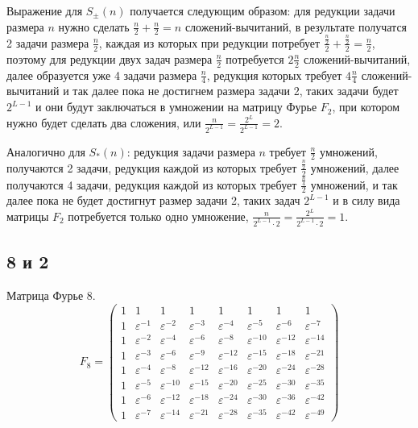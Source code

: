 Выражение для $S_\pm(n)$ получается следующим образом: для редукции задачи размера $n$ нужно сделать $\frac{n}{2} + \frac{n}{2} = n$ сложений-вычитаний,
в результате получатся 2 задачи размера $\frac{n}{2}$, каждая из которых при редукции потребует $\frac{\frac{n}{2}}{2} + \frac{\frac{n}{2}}{2} = \frac{n}{2}$, поэтому для редукции
двух задач размера $\frac{n}{2}$ потребуется $2 \frac{n}{2}$ сложений-вычитаний, далее образуется уже 4 задачи размера $\frac{n}{4}$, редукция которых требует $4 \frac{n}{4}$
сложений-вычитаний и так далее пока не достигнем размера задачи 2, таких задачи будет $2^{L-1}$ и они будут заключаться в умножении на матрицу Фурье $F_2$, при котором нужно будет
сделать два сложения, или $\frac{n}{2^{L-1}} = \frac{2^L}{2^{L-1}} = 2$.

Аналогично для $S_*(n)$: редукция задачи размера $n$ требует $\frac{n}{2}$ умножений, получаются 2 задачи, редукция каждой из которых требует $\frac{\frac{n}{2}}{2}$ умножений, далее
получаются 4 задачи, редукция каждой из которых требует $\frac{\frac{n}{4}}{2}$ умножений, и так далее пока не будет достигнут размер задачи 2, таких задач $2^{L-1}$ и в силу
вида матрицы $F_2$ потребуется только одно умножение, $\frac{n}{2^{L-1} \cdot 2} = \frac{2^L}{2^{L-1} \cdot 2} = 1$.

\subsection{8 и 2}

Матрица Фурье 8.
\[
    F_8
    = \begin{pmatrix}
          1 & 1                & 1                 & 1                 & 1                 & 1                 & 1                 & 1                 \\
          1 & \varepsilon^{-1} & \varepsilon^{-2}  & \varepsilon^{-3}  & \varepsilon^{-4}  & \varepsilon^{-5}  & \varepsilon^{-6}  & \varepsilon^{-7} \\
          1 & \varepsilon^{-2} & \varepsilon^{-4}  & \varepsilon^{-6}  & \varepsilon^{-8}  & \varepsilon^{-10} & \varepsilon^{-12} & \varepsilon^{-14} \\
          1 & \varepsilon^{-3} & \varepsilon^{-6}  & \varepsilon^{-9}  & \varepsilon^{-12} & \varepsilon^{-15} & \varepsilon^{-18} & \varepsilon^{-21} \\
          1 & \varepsilon^{-4} & \varepsilon^{-8}  & \varepsilon^{-12} & \varepsilon^{-16} & \varepsilon^{-20} & \varepsilon^{-24} & \varepsilon^{-28} \\
          1 & \varepsilon^{-5} & \varepsilon^{-10} & \varepsilon^{-15} & \varepsilon^{-20} & \varepsilon^{-25} & \varepsilon^{-30} & \varepsilon^{-35} \\
          1 & \varepsilon^{-6} & \varepsilon^{-12} & \varepsilon^{-18} & \varepsilon^{-24} & \varepsilon^{-30} & \varepsilon^{-36} & \varepsilon^{-42} \\
          1 & \varepsilon^{-7} & \varepsilon^{-14} & \varepsilon^{-21} & \varepsilon^{-28} & \varepsilon^{-35} & \varepsilon^{-42} & \varepsilon^{-49}
    \end{pmatrix}
\]

